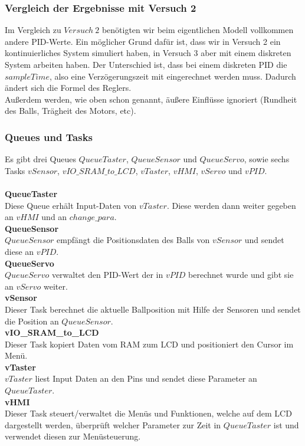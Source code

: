 \subsubsection{Vergleich der Ergebnisse mit Versuch 2}
Im Vergleich zu $Versuch\ 2$ benötigten wir beim eigentlichen Modell vollkommen andere PID-Werte. Ein möglicher Grund dafür ist, dass wir in Versuch 2 ein kontinuierliches System simuliert haben, in Versuch 3 aber mit einem diskreten System arbeiten haben. Der Unterschied ist, dass bei einem diskreten PID die $sampleTime$, also eine Verzögerungszeit mit eingerechnet werden muss. Dadurch ändert sich die Formel des Reglers.\\
Außerdem werden, wie oben schon genannt, äußere Einflüsse ignoriert (Rundheit des Balls, Trägheit des Motors, etc).

\subsubsection{Queues und Tasks}
Es gibt drei Queues $QueueTaster$, $QueueSensor$ und $QueueServo$, sowie sechs Tasks $vSensor$, $vIO\_SRAM\_to\_LCD$, $vTaster$, $vHMI$, $vServo$ und $vPID$.\\
\\
{\bfseries QueueTaster}\\
Diese Queue erhält Input-Daten von $vTaster$. Diese werden dann weiter gegeben an $vHMI$ und an $change\_para$.\\
{\bfseries QueueSensor} \\
$QueueSensor$ empfängt die Positionsdaten des Balls von $vSensor$ und sendet diese an $vPID$.\\
{\bfseries QueueServo} \\
$QueueServo$ verwaltet den PID-Wert der in $vPID$ berechnet wurde und gibt sie an $vServo$ weiter.\\
{\bfseries vSensor} \\
Dieser Task berechnet die aktuelle Ballposition mit Hilfe der Sensoren und sendet die Position an $QueueSensor$.\\
{\bfseries vIO\_SRAM\_to\_LCD} \\
Dieser Task kopiert Daten vom RAM zum LCD und positioniert den Cursor im Menü.\\
{\bfseries vTaster} \\
$vTaster$ liest Input Daten an den Pins und sendet diese Parameter an $QueueTaster$.\\
{\bfseries vHMI} \\
Dieser Task steuert/verwaltet die Menüs und Funktionen, welche auf dem LCD dargestellt werden, überprüft welcher Parameter zur Zeit in $QueueTaster$ ist und verwendet diesen zur Menüsteuerung.\\
